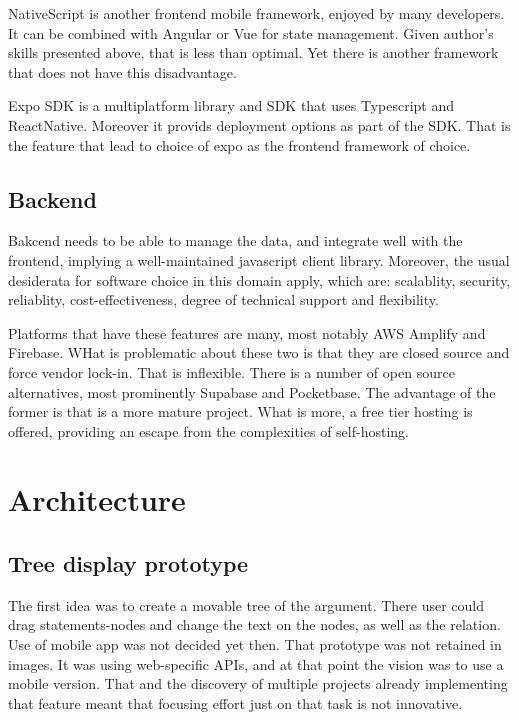 \documentclass{report}
\begin{document}
NativeScript is another frontend mobile framework, enjoyed by many developers. It can be combined with Angular or Vue for state management.
\cite{noauthor_nativescript_nodate}
Given author's skills presented above, that is less than optimal. Yet there is another framework that does not have this disadvantage.

Expo SDK is a multiplatform library and SDK that uses Typescript and ReactNative.
Moreover it provids deployment options as part of the SDK. That is the feature that lead to choice of expo as the frontend framework of choice. 

\subsection{Backend}

Bakcend needs to be able to manage the data, and integrate well with the frontend, implying a well-maintained javascript client library.
Moreover, the usual desiderata for software choice in this domain apply, which are: scalablity, security, reliablity, cost-effectiveness, degree of technical support and flexibility. 

Platforms that have these features are many, most notably AWS Amplify and Firebase. WHat is problematic about these two is that they are closed source and force vendor lock-in. 
\cite{noauthor_firebase_2023}
\cite{noauthor_aws-amplifyamplify-js_2023}
That is inflexible. There is a number of open source alternatives, most prominently Supabase and Pocketbase. 
\cite{noauthor_supabase-js_2023} \cite{noauthor_pocketbase_2023}
The advantage of the former is that is a more mature project. What is more, a free tier hosting is offered, providing an escape from the complexities of self-hosting. 
\cite{noauthor_pocketbase_nodate}

\section{Architecture}
\subsection{Tree display prototype}
The first idea was to create a movable tree of the argument. There user could drag statements-nodes and change the text on the nodes, as well as the relation.
Use of mobile app was not decided yet then. That prototype was not retained in images. It was using web-specific APIs, and at that point the vision was to use a mobile version. That and the discovery of multiple projects already implementing that feature meant that focusing effort just on that task is not innovative. 
\end{document}
